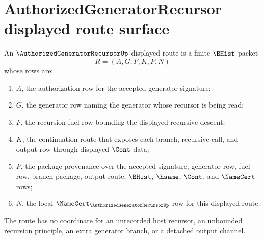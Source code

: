 \section{AuthorizedGeneratorRecursor displayed route surface}
\label{sec:authorized-generator-recursor-displayed-route-surface}

\begin{definition}
\label{def:authorized-generator-recursor-displayed-route}
An $\AuthorizedGeneratorRecursorUp$ displayed route is a finite $\BHist$ packet
$$
R=(A,G,F,K,P,N)
$$
whose rows are:
\begin{enumerate}
\item $A$, the authorization row for the accepted generator signature;
\item $G$, the generator row naming the generator whose recursor is being read;
\item $F$, the recursion-fuel row bounding the displayed recursive descent;
\item $K$, the continuation route that exposes each branch, recursive call, and output row through displayed $\Cont$ data;
\item $P$, the package provenance over the accepted signature, generator row, fuel row, branch package, output route, $\BHist$, $\hsame$, $\Cont$, and $\NameCert$ rows;
\item $N$, the local $\NameCert_{\AuthorizedGeneratorRecursorUp}$ row for this displayed route.
\end{enumerate}
The route has no coordinate for an unrecorded host recursor, an unbounded recursion principle, an extra generator branch, or a detached output channel.
\end{definition}

